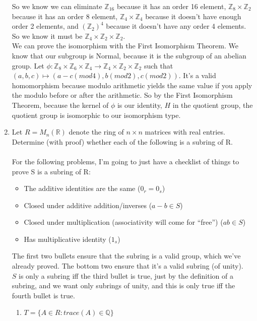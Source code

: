 \begin{enumerate}
  So we know we can eliminate $\mathds{Z}_{16}$ because it has an order 16 element, $\mathds{Z}_8 \times \mathds{Z}_2$ because it has an order 8 element, $\mathds{Z}_4 \times \mathds{Z}_4$ because it doesn't have enough order 2 elements, and $(\mathds{Z}_2)^4$ because it doesn't have any order 4 elements. So we know it must be $\mathds{Z}_4 \times \mathds{Z}_2 \times \mathds{Z}_2$.\\
  
  We can prove the isomorphism with the First Isomorphism Theorem. We know that our subgroup is Normal, because it is the subgroup of an abelian group. Let $\phi : \mathds{Z}_8 \times \mathds{Z}_6 \times \mathds{Z}_4 \rightarrow \mathds{Z}_4 \times \mathds{Z}_2 \times \mathds{Z}_2$  such that $(a,b,c) \mapsto (a-c (mod 4), b (mod 2), c (mod 2))$. It's a valid homomorphism because modulo arithmetic yields the same value if you apply the modulo before or after the arithmetic. So by the First Isomorphism Theorem, because the kernel of $\phi$ is our identity, $H$ in the quotient group, the quotient group is isomorphic to our isomorphism type.
\item Let $R = M_n(\mathds{R})$ denote the ring of $n \times n$ matrices with real entries. Determine (with proof) whether each of the following is a subring of R.\\\\

  For the following problems, I'm going to just have a checklist of things to prove S is a subring of R:
  \begin{itemize}
    \item The additive identities are the same ($0_r = 0_s$)
    \item Closed under additive addition/inverses ($a - b \in S$)
    \item Closed under multiplication (associativity will come for ``free'') ($ab \in S$)
    \item Has multiplicative identity ($1_s$)
  \end{itemize}
  The first two bullets ensure that the subring is a valid group, which we've already proved. The bottom two ensure that it's a valid subring (of unity).\\
  $S$ is only a subring iff the third bullet is true, just by the definition of a subring, and we want only subrings of unity, and this is only true iff the fourth bullet is true.

  \begin{enumerate}
    \item $T = \{A \in R : trace(A) \in \mathds{Q}\}$\\


\end{enumerate}
\end{enumerate}
